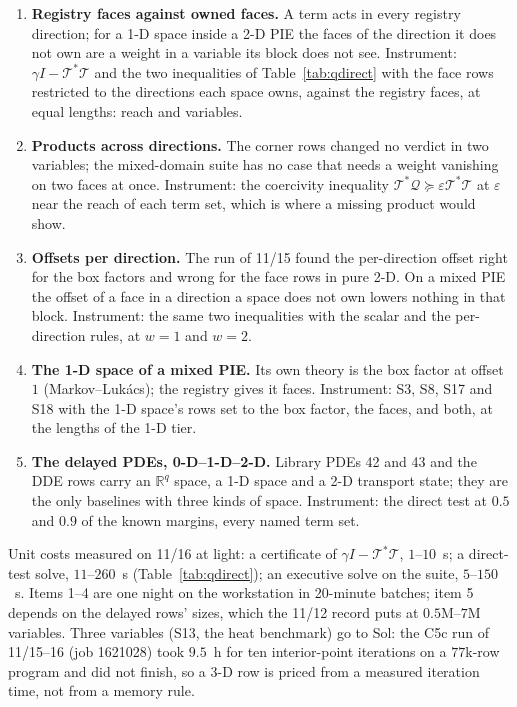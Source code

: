 \documentclass[12pt]{article}
\newcommand{\R}{\mathbb{R}}
\newcommand{\mcl}[1]{\mathcal{#1}}
\theoremstyle{plain}
\theoremstyle{definition}
\theoremstyle{remark}
\begin{document}
\begin{enumerate}\setlength\itemsep{0pt}
\item \textbf{Registry faces against owned faces.} A term acts in every registry direction; for a 1-D space inside a 2-D PIE the faces of the direction it does not own are a weight in a variable its block does not see. Instrument: $\gamma I-\mcl T^*\mcl T$ and the two inequalities of Table~\ref{tab:qdirect} with the face rows restricted to the directions each space owns, against the registry faces, at equal lengths: reach and variables.
\item \textbf{Products across directions.} The corner rows changed no verdict in two variables; the mixed-domain suite has no case that needs a weight vanishing on two faces at once. Instrument: the coercivity inequality $\mcl T^*\mcl Q\succeq\varepsilon\mcl T^*\mcl T$ at $\varepsilon$ near the reach of each term set, which is where a missing product would show.
\item \textbf{Offsets per direction.} The run of 11/15 found the per-direction offset right for the box factors and wrong for the face rows in pure 2-D. On a mixed PIE the offset of a face in a direction a space does not own lowers nothing in that block. Instrument: the same two inequalities with the scalar and the per-direction rules, at $w=1$ and $w=2$.
\item \textbf{The 1-D space of a mixed PIE.} Its own theory is the box factor at offset $1$ (Markov--Luk\'acs); the registry gives it faces. Instrument: S3, S8, S17 and S18 with the 1-D space's rows set to the box factor, the faces, and both, at the lengths of the 1-D tier.
\item \textbf{The delayed PDEs, 0-D--1-D--2-D.} Library PDEs 42 and 43 and the DDE rows carry an $\R^q$ space, a 1-D space and a 2-D transport state; they are the only baselines with three kinds of space. Instrument: the direct test at $0.5$ and $0.9$ of the known margins, every named term set.
\end{enumerate}

Unit costs measured on 11/16 at light: a certificate of $\gamma I-\mcl T^*\mcl T$, $1$--$10$~s; a direct-test solve, $11$--$260$~s (Table~\ref{tab:qdirect}); an executive solve on the suite, $5$--$150$~s. Items 1--4 are one night on the workstation in 20-minute batches; item 5 depends on the delayed rows' sizes, which the 11/12 record puts at $0.5$M--$7$M variables. Three variables (S13, the heat benchmark) go to Sol: the C5c run of 11/15--16 (job 1621028) took $9.5$~h for ten interior-point iterations on a $77$k-row program and did not finish, so a 3-D row is priced from a measured iteration time, not from a memory rule.
\end{document}
